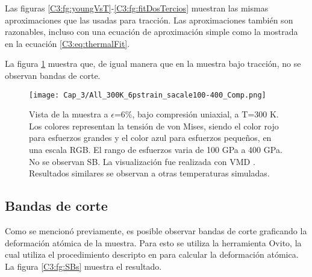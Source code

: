 
Las figuras \ref{C3:fg:youngVsT}-\ref{C3:fg:fitDosTercios} muestran las mismas aproximaciones que las usadas para tracción. Las aproximaciones también son razonables, incluso con una ecuación de aproximación simple como la mostrada en la ecuación \ref{C3:eq:thermalFit}.


La figura \ref{C3:fg:sampleComp} muestra que, de igual manera que en la muestra bajo tracción, no se observan bandas de corte.


\begin{figure}[htp]
\centering
\texttt{[image: Cap\_3/All\_300K\_6pstrain\_sacale100-400\_Comp.png]}
\caption[Vista de la muestra a $\epsilon$=6\%, bajo compresión uniaxial, a T=300 K.]{Vista de la muestra a $\epsilon$=6\%, bajo compresión uniaxial, a T=300 K. Los colores representan la tensión de von Mises, siendo el color rojo para esfuerzos grandes y el color azul para esfuerzos pequeños, en una escala RGB. El rango de esfuerzos varia de 100 GPa a 400 GPa. No se observan SB. La visualización fue realizada con VMD \citep{humphrey96}. Resultados similares se observan a otras temperaturas simuladas.}
\label{C3:fg:sampleComp}
\end{figure}

\subsection{Bandas de corte}
\label{S3_3_1}

Como se mencionó previamente, es posible observar bandas de corte graficando la deformación atómica de la muestra. Para esto se utiliza la herramienta Ovito, la cual utiliza el procedimiento descripto en \cite{shimizu07} para calcular la deformación atómica. La figura \ref{C3:fg:SBs} muestra el resultado.

